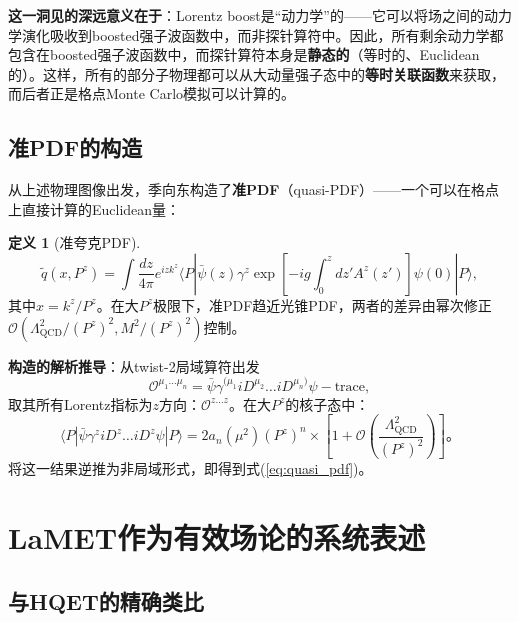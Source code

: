 \documentclass[12pt,a4paper]{ctexart}
\theoremstyle{definition}
\newtheorem{definition}{定义}[section]
\begin{document}
\textbf{这一洞见的深远意义在于}\cite{Ji2017More}：Lorentz boost是``动力学''的——它可以将场之间的动力学演化吸收到boosted强子波函数中，而非探针算符中。因此，所有剩余动力学都包含在boosted强子波函数中，而探针算符本身是\textbf{静态的}（等时的、Euclidean的）。这样，所有的部分子物理都可以从大动量强子态中的\textbf{等时关联函数}来获取，而后者正是格点Monte Carlo模拟可以计算的。

\subsection{准PDF的构造}

从上述物理图像出发，季向东\cite{Ji2013Euclidean}构造了\textbf{准PDF}（quasi-PDF）——一个可以在格点上直接计算的Euclidean量：

\begin{definition}[准夸克PDF]\cite{Ji2013Euclidean}
\begin{equation}
\boxed{\tilde{q}(x, P^z) = \int \frac{dz}{4\pi} e^{izk^z} \langle P| \bar{\psi}(z) \gamma^z \exp\left[-ig\int_0^z dz' A^z(z')\right] \psi(0) |P\rangle},
\label{eq:quasi_pdf}
\end{equation}
其中$x = k^z/P^z$。在大$P^z$极限下，准PDF趋近光锥PDF，两者的差异由幂次修正$\mathcal{O}(\Lambda_{\text{QCD}}^2/(P^z)^2, M^2/(P^z)^2)$控制。
\end{definition}

\textbf{构造的解析推导}\cite{Ji2013Euclidean}：从twist-2局域算符出发
\begin{equation}
\mathcal{O}^{\mu_1\ldots\mu_n} = \bar{\psi}\gamma^{(\mu_1}iD^{\mu_2}\ldots iD^{\mu_n)}\psi - \text{trace},
\end{equation}
取其所有Lorentz指标为$z$方向：$\mathcal{O}^{z\ldots z}$。在大$P^z$的核子态中：
\begin{equation}
\langle P| \bar{\psi}\gamma^z iD^z\ldots iD^z\psi |P\rangle = 2a_n(\mu^2)(P^z)^n \times \left[1 + \mathcal{O}\left(\frac{\Lambda_{\text{QCD}}^2}{(P^z)^2}\right)\right]。
\end{equation}
将这一结果逆推为非局域形式，即得到式(\ref{eq:quasi_pdf})。

\section{LaMET作为有效场论的系统表述}

\subsection{与HQET的精确类比}
\end{document}
